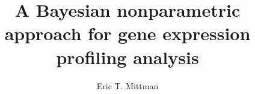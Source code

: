 \documentclass[12pt]{article}
\title{A Bayesian nonparametric approach for gene expression profiling analysis}
\author{Eric T. Mittman}
\begin{document}
  \maketitle

  \tableofcontents

  \doublespacing

  

  
\end{document}
